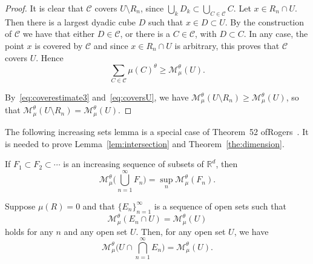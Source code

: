 \begin{proof}
It is clear that $\mathscr{C}$ covers $U \setminus R_n$, since $\bigcup_k D_k \subset \bigcup_{C \in \mathscr{C}} C$. Let $x \in R_n
\cap U$. Then there is a largest dyadic cube $D$ such that $x \in D
\subset U$. By the construction of $\mathscr{C}$ we have that either $D \in \mathscr{C}$, or there is a $C \in \mathscr{C}$, with $D
\subset C$. In any case, the point $x$ is covered by $\mathscr{C}$ and since $x \in R_n \cap U$ is arbitrary, this proves that $\mathscr{C}$ covers $U$. Hence
\begin{equation}\label{eq:coversU}
\sum_{C \in \mathscr{C}} \mu (C)^\theta \geq \mathscr{M}_\mu^\theta (U).
\end{equation}

By~\eqref{eq:coverestimate3} and~\eqref{eq:coversU}, we have $\mathscr{M}_\mu^\theta (U \setminus R_n) \geq
\mathscr{M}_\mu^\theta (U)$, so that $\mathscr{M}_\mu^\theta (U
\setminus R_n) = \mathscr{M}_\mu^\theta (U)$.
\end{proof}

The following increasing sets lemma is a special case of Theorem~52 of\linebreak Rogers~\cite{rogers}. It is needed to prove Lemma~\ref{lem:intersection} and Theorem~\ref{the:dimension}.

\begin{lemm}\label{lem:increasingsets}
If $F_1 \subset F_2 \subset \cdots$ is an increasing sequence of\/ subsets of\/ $\mathbb{R}^d$, then
\[
\mathscr{M}_\mu^\theta \biggl(\bigcup_{n=1}^\infty F_n \biggr) =
\sup_n \mathscr{M}_\mu^\theta (F_n).
\]
\end{lemm}

\begin{lemm}\label{lem:intersection}
Suppose $\mu (R) = 0$ and that $\{E_n\}_{n=1}^\infty$ is a sequence of open sets such that
\begin{equation}\label{eq:intersectionlemma}
\mathscr{M}_\mu^\theta (E_n \cap U) =
\mathscr{M}_\mu^\theta (U)
\end{equation}
holds for any $n$ and any open set $U$. Then, for any open set $U$, we have
\[
\mathscr{M}_\mu^\theta \biggl(U \cap \bigcap_{n=1}^\infty E_n
\biggr) = \mathscr{M}_\mu^\theta (U).
\]
\end{lemm}

